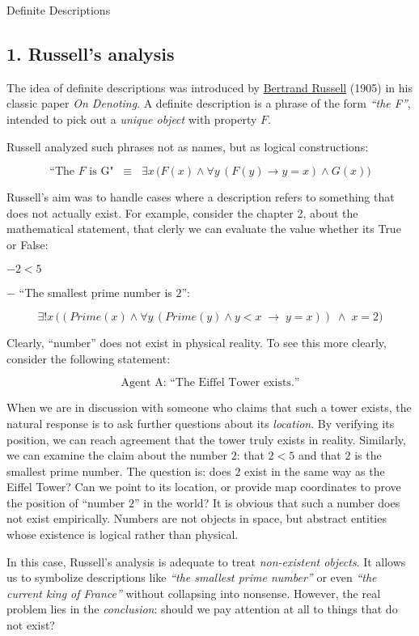 Definite Descriptions

\subsection{1. Russell's analysis}\label{russells-analysis}

The idea of definite descriptions was introduced by
\href{https://en.wikipedia.org/wiki/Bertrand_Russell}{Bertrand Russell}
(1905) in his classic paper \emph{On Denoting}. A definite description
is a phrase of the form \emph{``the F''}, intended to pick out a
\emph{unique object} with property \(F\).

Russell analyzed such phrases not as names, but as logical
constructions:

\[
\text{“The } F \text{ is G"}\;\;\equiv\;\; \exists x \, \big( F(x) \land \forall y \, (F(y) \to y = x) \land G(x) \big)
\]

Russell's aim was to handle cases where a description refers to
something that does not actually exist. For example, consider the
chapter 2, about the mathematical statement, that clerly we can evaluate
the value whether its True or False:

\(− 2 < 5\)

− ``The smallest prime number is \(2\)'':

\[
\exists! x \, \big( (Prime(x) \land \forall y \, (Prime(y) \land y < x \;\to\; y = x)) \;\land\; x = 2 \big)
\]

Clearly, ``number'' does not exist in physical reality. To see this more
clearly, consider the following statement:

\[
\text{Agent A: “The Eiffel Tower exists.”}
\]

When we are in discussion with someone who claims that such a tower
exists, the natural response is to ask further questions about its
\emph{location}. By verifying its position, we can reach agreement that
the tower truly exists in reality. Similarly, we can examine the claim
about the number \(2\): that \(2 < 5\) and that \(2\) is the smallest
prime number. The question is: does \(2\) exist in the same way as the
Eiffel Tower? Can we point to its location, or provide map coordinates
to prove the position of ``number \(2\)'' in the world? It is obvious
that such a number does not exist empirically. Numbers are not objects
in space, but abstract entities whose existence is logical rather than
physical.

In this case, Russell's analysis is adequate to treat \emph{non-existent
objects}. It allows us to symbolize descriptions like \emph{``the
smallest prime number''} or even \emph{``the current king of France''}
without collapsing into nonsense. However, the real problem lies in the
\emph{conclusion}: should we pay attention at all to things that do not
exist?

